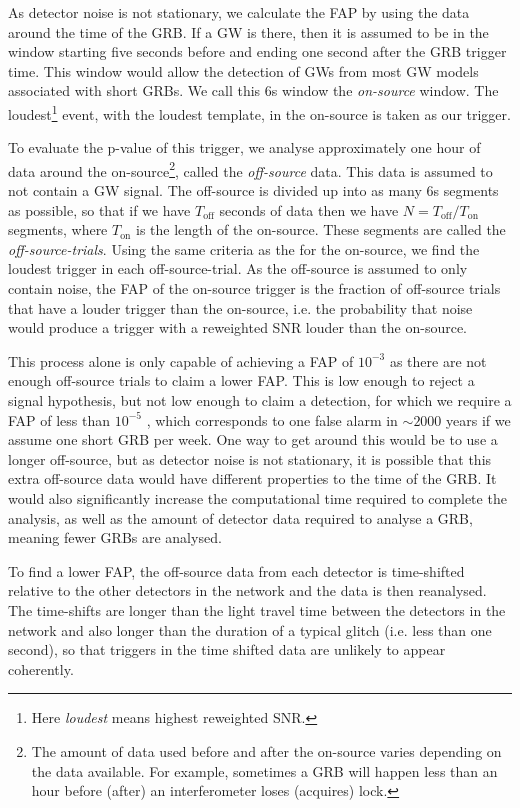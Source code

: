 \documentclass[11pt]{cuthesis}
\begin{document}
As detector noise is not stationary, we calculate the FAP by using the data around the time of the GRB. If a GW is there, then it is assumed to be in the window starting five seconds before and ending one second after the GRB trigger time. This window would allow the detection of GWs from most GW models associated with short GRBs. We call this 6s window the \textit{on-source} window. The loudest\footnote{Here \textit{loudest} means highest reweighted SNR.} event, with the loudest template, in the on-source is taken as our trigger. 

To evaluate the p-value of this trigger, we analyse approximately one hour of data around the on-source\footnote{The amount of data used before and after the on-source varies depending on the data available. For example, sometimes a GRB will happen less than an hour before (after) an interferometer loses (acquires) lock.}, called the \textit{off-source} data. This data is assumed to not contain a GW signal. The off-source is divided up into as many 6s segments as possible, so that if we have $T_\text{off}$ seconds of data then we have $N=T_\text{off} / T_\text{on}$ segments, where $T_\text{on}$ is the length of the on-source. These segments are called the \textit{off-source-trials}. Using the same criteria as the for the on-source, we find the loudest trigger in each off-source-trial. As the off-source is assumed to only contain noise, the FAP of the on-source trigger is the fraction of off-source trials that have a louder trigger than the on-source, i.e. the probability that noise would produce a trigger with a reweighted SNR louder than the on-source. 

This process alone is only capable of achieving a FAP of $10^{-3}$ as there are not enough off-source trials to claim a lower FAP. This is low enough to reject a signal hypothesis, but not low enough to claim a detection, for which we require a FAP of less than $10^{-5}$ \cite{pygrb_Williamson:2014}, which corresponds to one false alarm in $\sim2000$ years if we assume one short GRB per week. One way to get around this would be to use a longer off-source, but as detector noise is not stationary, it is possible that this extra off-source data would have different properties to the time of the GRB. It would also significantly increase the computational time required to complete the analysis, as well as the amount of detector data required to analyse a GRB, meaning fewer GRBs are analysed.

To find a lower FAP, the off-source data from each detector is time-shifted relative to the other detectors in the network and the data is then reanalysed. The time-shifts are longer than the light travel time between the detectors in the network and also longer than the duration of a typical glitch (i.e. less than one second), so that triggers in the time shifted data are unlikely to appear coherently.  
\end{document}
